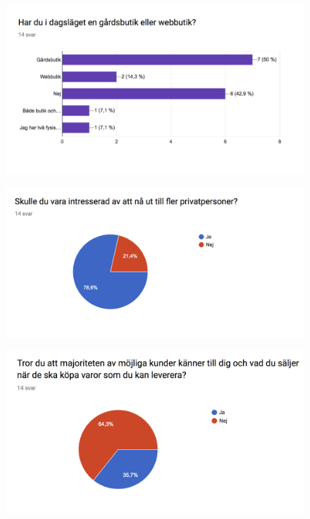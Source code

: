 \documentclass[10pt,a4paper,oneside]{article}
\begin{document}
\begin{figure}[H]
	\includegraphics[scale=0.6]{5.png}
\end{figure}

\begin{figure}[H]
	\includegraphics[scale=0.6]{6.png}
\end{figure}

\begin{figure}[H]
	\includegraphics[scale=0.6]{7.png}
\end{figure}
\end{document}
